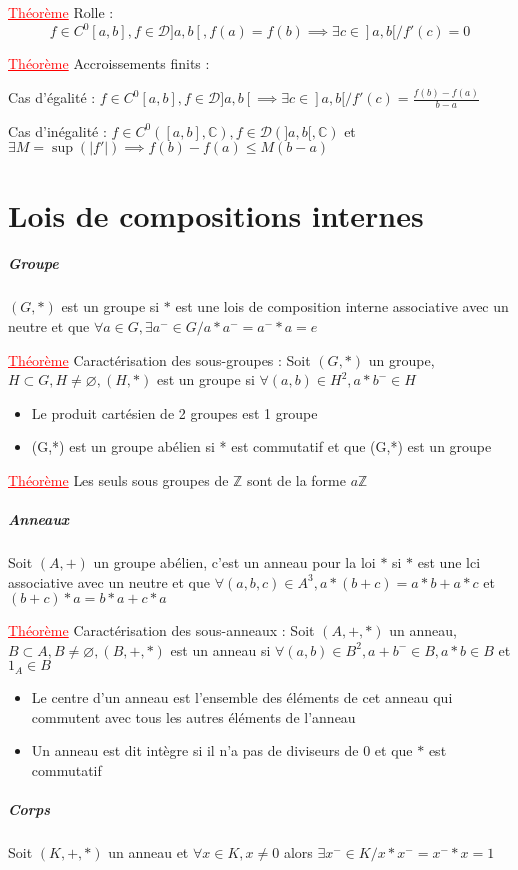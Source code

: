 \documentclass[a4paper, french]{article}
\newcommand{\C}{\mathbb{C}}
\newcommand{\Z}{\mathbb{Z}}
\newcommand{\D}{\mathcal{D}}
\newcommand{\thm}{\textcolor{red}{\underline{Théorème} }}
\begin{document}
	 \thm Rolle : \[f\in C^0[a,b], f \in \D]a,b[, f(a)=f(b) \implies \exists c \in ]a,b[ / f'(c)=0\]

	 \thm Accroissements finits : 
		\begin{center}
			Cas d'égalité : $f\in C^0[a,b], f \in \D]a,b[ \implies \exists c \in ]a,b[ / f'(c)=\frac{f(b)-f(a)}{b-a}$ 
	 
			Cas d'inégalité : $f\in C^0([a,b],\C), f \in \D(]a,b[,\C)$ et $\exists M=\sup(|f'|) \implies f(b)-f(a)\leqslant M(b-a)$
		\end{center}

	\section{Lois de compositions internes}
	\subparagraph{Groupe}
	$(G,*)$ est un groupe si $*$ est une lois de composition interne associative avec un neutre et que $\forall a \in G, \exists a^- \in G / a*a^-=a^-*a=e$ 
	 
	\thm Caractérisation des sous-groupes : Soit $(G,*)$ un groupe, $H \subset G, H \neq \varnothing, 
	  (H,*)$ est un groupe si $\forall (a,b) \in H^2, a*b^- \in H$
	\begin{itemize}[label=\(\bullet\)]
	  \item Le produit cartésien de 2 groupes est 1 groupe
	  \item (G,*) est un groupe abélien si * est commutatif et que (G,*) est un groupe
	\end{itemize}

	 \thm Les seuls sous groupes de $\Z$ sont de la forme $a\Z$

	\subparagraph{Anneaux}
	Soit $(A,+)$ un groupe abélien, c'est un anneau pour la loi $*$ si $*$ est une lci associative avec un neutre et que $\forall (a,b,c)\in A^3, a*(b+c)=a*b+a*c$ et $ (b+c)*a=b*a+c*a$ 
	 
	 \thm Caractérisation des sous-anneaux : Soit $(A,+,*)$ un anneau, $B \subset A, B\neq \varnothing, 
	  (B,+,*)$ est un anneau si $\forall (a,b) \in B^2, a+b^-\in B, a*b \in B$ et $1_A \in B$
	\begin{itemize}[label=\(\bullet\)]
	  \item Le centre d'un anneau est l'ensemble des éléments de cet anneau qui commutent avec tous les autres éléments de l'anneau
	  \item Un anneau est dit intègre si il n'a pas de diviseurs de 0 et que $*$ est commutatif
	\end{itemize}

	\subparagraph{Corps}
	Soit $(K,+,*)$ un anneau et $\forall x \in K, x\neq0$ alors $\exists x^- \in K / x*x^-=x^-*x=1$
\end{document}
